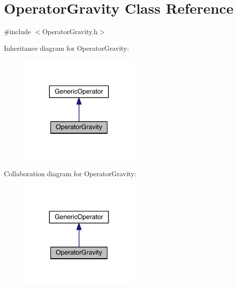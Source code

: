 \hypertarget{class_operator_gravity}{}\section{Operator\+Gravity Class Reference}
\label{class_operator_gravity}


{\ttfamily \#include $<$Operator\+Gravity.\+h$>$}



Inheritance diagram for Operator\+Gravity\+:\nopagebreak
\begin{figure}[H]
\begin{center}
\leavevmode
\includegraphics[width=170pt]{d4/d94/class_operator_gravity__inherit__graph}
\end{center}
\end{figure}


Collaboration diagram for Operator\+Gravity\+:\nopagebreak
\begin{figure}[H]
\begin{center}
\leavevmode
\includegraphics[width=170pt]{d9/d64/class_operator_gravity__coll__graph}
\end{center}
\end{figure}
